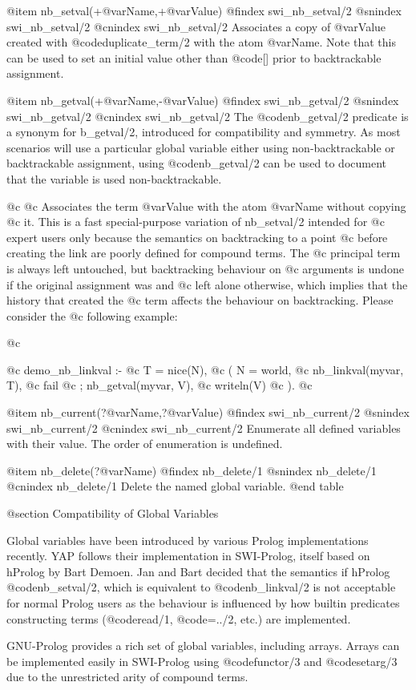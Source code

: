 @item nb_setval(+@var{Name},+@var{Value})
@findex swi_nb_setval/2
@snindex swi_nb_setval/2
@cnindex swi_nb_setval/2
Associates a copy of @var{Value} created with @code{duplicate_term/2}
with the atom @var{Name}.  Note that this can be used to set an
initial value other than @code{[]} prior to backtrackable assignment.

@item nb_getval(+@var{Name},-@var{Value})
@findex swi_nb_getval/2
@snindex swi_nb_getval/2
@cnindex swi_nb_getval/2
The @code{nb_getval/2} predicate is a synonym for b_getval/2, introduced for
compatibility and symmetry.  As most scenarios will use a particular
global variable either using non-backtrackable or backtrackable
assignment, using @code{nb_getval/2} can be used to document that the 
variable is used non-backtrackable.

@c     
@c Associates the term @var{Value} with the atom @var{Name} without copying
@c it. This is a fast special-purpose variation of nb_setval/2 intended for
@c expert users only because the semantics on backtracking to a point
@c before creating the link are poorly defined for compound terms. The
@c principal term is always left untouched, but backtracking behaviour on
@c arguments is undone if the original assignment was  and
@c left alone otherwise, which implies that the history that created the
@c term affects the behaviour on backtracking. Please consider the
@c following example:

@c \begin{code}
@c demo_nb_linkval :-
@c 	T = nice(N),
@c 	(   N = world,
@c 	    nb_linkval(myvar, T),
@c 	    fail
@c 	;   nb_getval(myvar, V),
@c 	    writeln(V)
@c 	).
@c \end{code}

@item nb_current(?@var{Name},?@var{Value})
@findex swi_nb_current/2
@snindex swi_nb_current/2
@cnindex swi_nb_current/2
Enumerate all defined variables with their value. The order of
enumeration is undefined.

@item nb_delete(?@var{Name})
@findex nb_delete/1
@snindex nb_delete/1
@cnindex nb_delete/1
Delete the named global variable.
@end table

@section Compatibility of Global Variables

Global variables have been introduced by various Prolog
implementations recently.  YAP follows their implementation in SWI-Prolog, itself
based on hProlog by Bart Demoen. Jan and Bart
decided that the semantics if hProlog @code{nb_setval/2}, which is
equivalent to @code{nb_linkval/2} is not acceptable for normal Prolog
users as the behaviour is influenced by how builtin predicates
constructing terms (@code{read/1}, @code{=../2}, etc.) are implemented.

GNU-Prolog provides a rich set of global variables, including arrays.
Arrays can be implemented easily in SWI-Prolog using @code{functor/3} and
@code{setarg/3} due to the unrestricted arity of compound terms.


